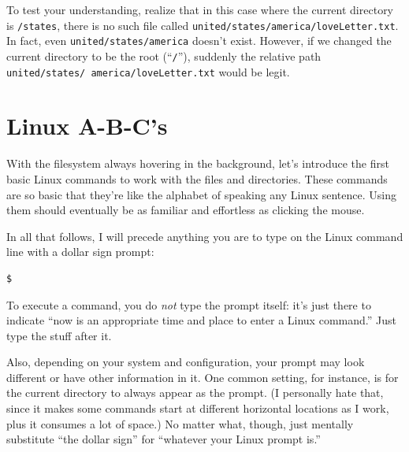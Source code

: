 To test your understanding, realize that in this case where the current
directory is \texttt{/states}, there is no such file called
\texttt{united/states/america/loveLetter.txt}. In fact, even 
\texttt{united/states/america} doesn't exist. However, if we changed the
current directory to be the root (``\texttt{/}''), suddenly the relative path
\texttt{united/states/ america/loveLetter.txt} would be legit.

\section{Linux A-B-C's}

With the filesystem always hovering in the background, let's introduce the
first basic Linux commands to work with the files and directories. These
commands are so basic that they're like the alphabet of speaking any Linux
sentence. Using them should eventually be as familiar and effortless as
clicking the mouse.

In all that follows, I will precede anything you are to type on the Linux
command line with a dollar sign prompt:

\begin{verbatim}
$
\end{verbatim}

To execute a command, you do \textit{not} type the prompt itself: it's just
there to indicate ``now is an appropriate time and place to enter a Linux
command.'' Just type the stuff after it.

Also, depending on your system and configuration, your prompt may look
different or have other information in it. One common setting, for instance,
is for the current directory to always appear as the prompt. (I personally
hate that, since it makes some commands start at different horizontal
locations as I work, plus it consumes a lot of space.) No matter what, though,
just mentally substitute ``the dollar sign'' for ``whatever your Linux prompt
is.''

\newcommand{\bigline}{\begin{center} \line(1,0){300} \end{center}}


